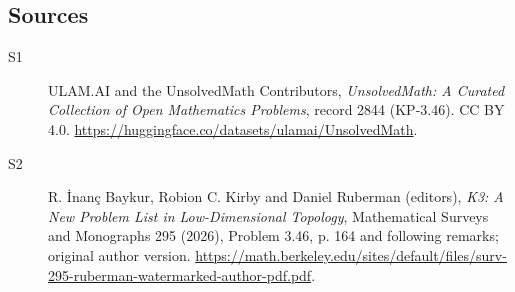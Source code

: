 \documentclass[11pt]{article}
\begin{document}
\subsection{Sources}
\begin{description}
\item[\hypertarget{source:2844:1}{S1}] ULAM.AI and the UnsolvedMath Contributors, \emph{UnsolvedMath: A Curated Collection of Open Mathematics Problems}, record 2844 (KP-3.46). CC BY 4.0. \url{https://huggingface.co/datasets/ulamai/UnsolvedMath}.
\item[\hypertarget{source:2844:2}{S2}] R. İnanç Baykur, Robion C. Kirby and Daniel Ruberman (editors), \emph{K3: A New Problem List in Low-Dimensional Topology}, Mathematical Surveys and Monographs 295 (2026), Problem 3.46, p. 164 and following remarks; original author version. \url{https://math.berkeley.edu/sites/default/files/surv-295-ruberman-watermarked-author-pdf.pdf}.
\end{description}
\label{end:2844}
\end{document}
